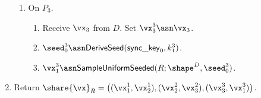 \begin{enumerate}
\begin{enumerate}
        \item On $P_3$.
        \begin{enumerate}
          \item Receive $\vx_3$ from $D$. Set $\vx_3^3 \asn \vx_3$.
          \item $\seed_0^3 \asn \mathsf{DeriveSeed}(\mathsf{sync\_key}_0, k_1^3)$.
          \item $\vx_1^3 \asn \mathsf{SampleUniformSeeded}(R; \shape^D, \seed_0^3)$.
        \end{enumerate}
    \end{enumerate}
  \item Return $\share{\vx}_R = \left( (\vx_1^1, \vx_2^1), (\vx_2^2, \vx_3^2), (\vx_3^3, \vx_1^3) \right)$.
  \end{enumerate}

